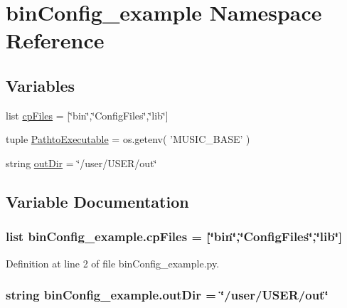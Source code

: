 \section{bin\-Config\-\_\-example Namespace Reference}
\label{namespacebinConfig__example}
\subsection*{Variables}
\begin{DoxyCompactItemize}
\item 
list \hyperlink{namespacebinConfig__example_a1ab84e59216b8e8b7a873db8f52cbbe5}{cp\-Files} = \mbox{[}\char`\"{}bin\char`\"{},\char`\"{}Config\-Files\char`\"{},\char`\"{}lib\char`\"{}\mbox{]}
\item 
tuple \hyperlink{namespacebinConfig__example_afa74a05175efd45e5fb0043b57f5706d}{Pathto\-Executable} = os.\-getenv( 'M\-U\-S\-I\-C\-\_\-\-B\-A\-S\-E' )
\item 
string \hyperlink{namespacebinConfig__example_a8a7d12ed52cd5c85fb64de14d725e1eb}{out\-Dir} = \char`\"{}/user/U\-S\-E\-R/out\char`\"{}
\end{DoxyCompactItemize}


\subsection{Variable Documentation}
\subsubsection[{cp\-Files}]{\setlength{\rightskip}{0pt plus 5cm}list bin\-Config\-\_\-example.\-cp\-Files = \mbox{[}\char`\"{}bin\char`\"{},\char`\"{}Config\-Files\char`\"{},\char`\"{}lib\char`\"{}\mbox{]}}\label{namespacebinConfig__example_a1ab84e59216b8e8b7a873db8f52cbbe5}


Definition at line 2 of file bin\-Config\-\_\-example.\-py.

\subsubsection[{out\-Dir}]{\setlength{\rightskip}{0pt plus 5cm}string bin\-Config\-\_\-example.\-out\-Dir = \char`\"{}/user/U\-S\-E\-R/out\char`\"{}}\label{namespacebinConfig__example_a8a7d12ed52cd5c85fb64de14d725e1eb}


